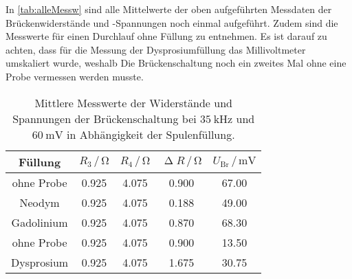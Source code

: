 In \autoref{tab:alleMessw} sind alle Mittelwerte der oben aufgeführten Messdaten der Brückenwiderstände und -Spannungen noch einmal aufgeführt. Zudem sind die Messwerte für einen Durchlauf ohne Füllung zu entnehmen.
Es ist darauf zu achten, dass für die Messung der Dysprosiumfüllung das Millivoltmeter umskaliert wurde, weshalb Die Brückenschaltung noch ein zweites Mal ohne eine Probe vermessen werden musste.
\begin{table}[H]
  \centering
  \caption{Mittlere Messwerte der Widerstände und Spannungen der Brückenschaltung bei $\SI{35}{\kilo\hertz}$ und $\SI{60}{\milli\volt}$ in Abhängigkeit der Spulenfüllung.}
  \label{tab:alleMessw}
  \begin{tabular}{c| c c c c}
    \toprule
    Füllung & $R_3 \,/\, \si{\ohm}$ & $R_4 \,/\, \si{\ohm}$ & $\upDelta R \,/\, \si{\ohm}$ & $U_{\text{Br}} \,/\, \si{\milli\volt}$ \\
    \midrule
    ohne Probe & 0.925 & 4.075 & 0.900 & 67.00 \\
    Neodym & 0.925 & 4.075 & 0.188 & 49.00\\ 
    Gadolinium & 0.925 & 4.075 & 0.870 & 68.30\\ \hline
    ohne Probe & 0.925 & 4.075 & 0.900 & 13.50 \\
    Dysprosium & 0.925 & 4.075 & 1.675 & 30.75 \\
    \bottomrule
  \end{tabular}
\end{table}